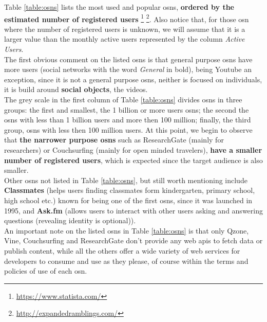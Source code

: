 \indent Table \ref{table:osns} lists the most used and popular \glspl{osn}, \textbf{ordered by the estimated number of registered users} \footnote{\url{https://www.statista.com/}} \footnote{\url{http://expandedramblings.com/}}.
Also notice that, for those \gls{osn} where the number of registered users is unknown, we will assume that it is a larger value than
the monthly active users represented by the column \textit{Active Users}.
\\
\indent The first obvious comment on the listed \glspl{osn} is that general purpose \glspl{osn} have more users (social
networks with the word \textit{General} in bold), being Youtube an exception, since it is not a general purpose \glspl{osn}, neither
is focused on individuals, it is build around \textbf{social objects}, the videos.
\\
\indent The grey scale in the first column of Table \ref{table:osns} divides \glspl{osn} in three groups: the first and smallest, the 1 billion
or more users \glspl{osn}; the second the \glspl{osn} with less than 1 billion users and more then 100 million; finally, the third group, \glspl{osn} with
less then 100 million users. At this point, we begin to observe that \textbf{the narrower purpose \glspl{osn}} such as ResearchGate (mainly for researchers) or
Couchsurfing (mainly for open minded travelers), \textbf{have a smaller number of registered users}, which is expected since the target audience is also smaller.
\\
\indent Other \glspl{osn} not listed in Table \ref{table:osns}, but still worth mentioning include \textbf{Classmates} (helps users finding
classmates form kindergarten, primary school, high school etc.) known for being one of the first \glspl{osn}, since it was
launched in 1995, and \textbf{Ask.fm} (allows users to interact with other users asking and answering questions (revealing identity is optional)).
\\
\indent An important note on the listed \glspl{osn} in Table \ref{table:osns} is that only Qzone, Vine, Couchsurfing and ResearchGate don't provide any web \glspl{api}
to fetch data or publish content, while all the others offer a wide variety of web services for developers to consume and use as they please, of course within the terms and policies
of use of each \gls{osn}.
